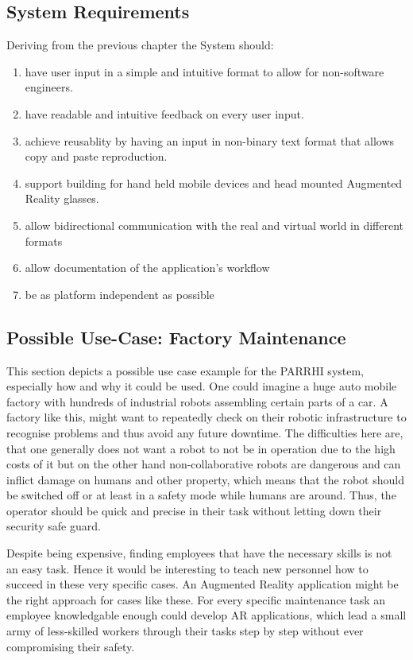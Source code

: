 \subsection{System Requirements}\label{Section:SystemRequirements}
Deriving from the previous chapter the System should:
\begin{enumerate}
	\setlength\itemsep{-1em}
	\item have user input in a simple and intuitive format to allow for non-software engineers.
	\item have readable and intuitive feedback on every user input.
	\item achieve reusablity by having an input in non-binary text format that allows copy and paste reproduction.
	\item support building for hand held mobile devices and head mounted Augmented Reality glasses.
	\item allow bidirectional communication with the real and virtual world in different formats
	\item allow documentation of the application's workflow
	\item be as platform independent as possible
\end{enumerate}

\subsection{Possible Use-Case: Factory Maintenance}
This section depicts a possible use case example for the PARRHI system, especially how and why it could be used. One could imagine a huge auto mobile factory with hundreds of industrial robots assembling certain parts of a car. A factory like this, might want to repeatedly check on their robotic infrastructure to recognise problems and thus avoid any future downtime. The difficulties here are, that one generally does not want a robot to not be in operation due to the high costs of it but on the other hand non-collaborative robots are dangerous and can inflict damage on humans and other property, which means that the robot should be switched off or at least in a safety mode while humans are around. Thus, the operator should be quick and precise in their task without letting down their security safe guard.

Despite being expensive, finding employees that have the necessary skills is not an easy task. Hence it would be interesting to teach new personnel how to succeed in these very specific cases. An Augmented Reality application might be the right approach for cases like these. For every specific maintenance task an employee knowledgable enough could develop AR applications, which lead a small army of less-skilled workers through their tasks step by step without ever compromising their safety.

